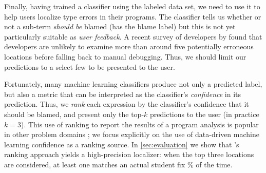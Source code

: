 


Finally, having trained a classifier
using the labeled data set, we need to use
it to help users localize type errors in
their programs.
%
The classifier tells us whether or not
a sub-term \emph{should be}
blamed (\ie has the blame label) but this
is not yet particularly suitable as
\emph{user feedback}.
%
A recent survey of developers by
\citet{Kochhar2016-oc} found that
developers are unlikely to examine
more than around five potentially
erroneous locations before falling
back to manual debugging.
%
Thus, we should limit our predictions
to a select few to be presented to
the user.

%
Fortunately, many machine learning
classifiers produce not only a predicted
label, but also a metric that can be
interpreted as the classifier's
\emph{confidence} in its prediction.
%
Thus, we \emph{rank} each expression
by the classifier's confidence that
it should be blamed, and present only
the top-$k$ predictions to the
user (in practice $k=3$).
%
This use of ranking to report the
results of a program analysis is
popular in other problem domains
\citep[see, \eg][]{Kremenek2003-ck};
we focus explicitly on the use of
data-driven machine learning
confidence as a ranking source.
%
In \autoref{sec:evaluation} we show
that \toolname's ranking approach
yields a high-precision localizer:
when the top three locations are considered,
at least one matches an actual student fix
\HiddenFhTopThree\% of the time.




